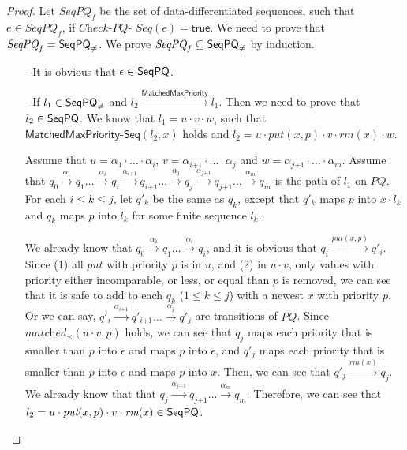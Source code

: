 \begin {proof}

Let $\textit{SeqPQ}_f$ be the set of data-differentiated sequences, such that $e \in \textit{SeqPQ}_f$, if $\textit{Check-PQ-}$ $\textit{Seq}(e)=\mathsf{true}$. We need to prove that $\textit{SeqPQ}_f = \mathsf{SeqPQ}_{\neq}$. 
We prove $\textit{SeqPQ}_f \subseteq \mathsf{SeqPQ}_{\neq}$ by induction.

\begin{itemize}
\setlength{\itemsep}{0.5pt}
\item[-] It is obvious that $\epsilon \in \mathsf{SeqPQ}$.

\item[-] If $l_1 \in \mathsf{SeqPQ}_{\neq}$ and $l_2 \xrightarrow{\mathsf{MatchedMaxPriority}} l_1$. Then we need to prove that $l_2 \in \mathsf{SeqPQ}$. We know that $l_1 = u \cdot v \cdot w$, such that $\mathsf{MatchedMaxPriority\text{-}Seq}(l_2,x)$ holds and $l_2 = u \cdot \textit{put}(x,p) \cdot v \cdot \textit{rm}(x) \cdot w$.

    Assume that $u = \alpha_1 \cdot \ldots \cdot \alpha_i$, $v = \alpha_{\textit{i+1}} \cdot \ldots \cdot \alpha_j$ and $w = \alpha_{\textit{j+1}} \cdot \ldots \cdot \alpha_m$. Assume that $q_0 \xrightarrow{\alpha_1} q_1 \ldots \xrightarrow{\alpha_i} q_i \xrightarrow{\alpha_{\textit{i+1}}} q_{\textit{i+1}} \ldots  \xrightarrow{\alpha_j} q_j \xrightarrow{\alpha_{\textit{j+1}}} q_{\textit{j+1}} \ldots \xrightarrow{\alpha_m} q_m$ is the path of $l_1$ on $\textit{PQ}$. For each $i \leq k \leq j$, let $q'_k$ be the same as $q_k$, except that $q'_k$ maps $p$ into $x \cdot l_k$ and $q_k$ maps $p$ into $l_k$ for some finite sequence $l_k$.

    We already know that $q_0 \xrightarrow{\alpha_1} q_1 \ldots \xrightarrow{\alpha_i} q_i$, and it is obvious that $q_i \xrightarrow{\textit{put}(x,p)} q'_i$. Since (1) all $\textit{put}$ with priority $p$ is in $u$, and (2) in $u \cdot v$, only values with priority either incomparable, or less, or equal than $p$ is removed, we can see that it is safe to add to each $q_k$ ($1 \leq k \leq j$) with a newest $x$ with priority $p$. Or we can say, $q'_i \xrightarrow{\alpha_{\textit{i+1}}} q'_{\textit{i+1}} \ldots \xrightarrow{\alpha_j} q'_j$ are transitions of $\textit{PQ}$. Since $\textit{matched}_{\prec}(u \cdot v,p)$ holds, we can see that $q_j$ maps each priority that is smaller than $p$ into $\epsilon$ and maps $p$ into $\epsilon$, and $q'_j$ maps each priority that is smaller than $p$ into $\epsilon$ and maps $p$ into $x$. Then, we can see that $q'_j \xrightarrow{\textit{rm}(x)} q_j$. We already know that that $q_j \xrightarrow{\alpha_{\textit{j+1}}} q_{\textit{j+1}} \ldots \xrightarrow{\alpha_m} q_m$. Therefore, we can see that $l_2 = u \cdot \textit{put}(x,p) \cdot v \cdot \textit{rm}(x) \in \mathsf{SeqPQ}$.


\end{itemize}
\end{proof}
